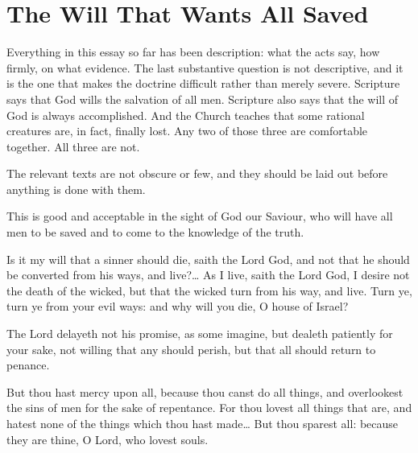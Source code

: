 \section{The Will That Wants All Saved}

Everything in this essay so far has been description: what the acts say, how firmly, on what evidence. The last substantive question is not descriptive, and it is the one that makes the doctrine difficult rather than merely severe. Scripture says that God wills the salvation of all men. Scripture also says that the will of God is always accomplished. And the Church teaches that some rational creatures are, in fact, finally lost. Any two of those three are comfortable together. All three are not.

The relevant texts are not obscure or few, and they should be laid out before anything is done with them.

\begin{studyframe}
\setlength{\parskip}{0.5em}
This is good and acceptable in the sight of God our Saviour, who will have all men to be saved and to come to the knowledge of the truth.

Is it my will that a sinner should die, saith the Lord God, and not that he should be converted from his ways, and live?\ldots{} As I live, saith the Lord God, I desire not the death of the wicked, but that the wicked turn from his way, and live. Turn ye, turn ye from your evil ways: and why will you die, O house of Israel?

The Lord delayeth not his promise, as some imagine, but dealeth patiently for your sake, not willing that any should perish, but that all should return to penance.

But thou hast mercy upon all, because thou canst do all things, and overlookest the sins of men for the sake of repentance. For thou lovest all things that are, and hatest none of the things which thou hast made\ldots{} But thou sparest all: because they are thine, O Lord, who lovest souls.
\end{studyframe}

